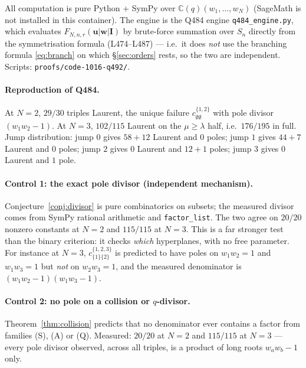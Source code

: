 \documentclass[11pt]{article}
\theoremstyle{plain}
\theoremstyle{definition}
\theoremstyle{remark}
\theoremstyle{plain}
\newcommand{\bI}{\mathbf{I}}
\newcommand{\bu}{\mathbf{u}}
\newcommand{\bw}{\mathbf{w}}
\begin{document}
All computation is pure Python $+$ SymPy over
$\mathbb{C}(q)(w_1,\dots,w_N)$ (SageMath is not installed in this container).
The engine is the Q484 engine \texttt{q484\_engine.py}, which evaluates
$F_{N,n,r}(\bu|\bw|\bI)$ by brute-force summation over $S_n$ directly from the
symmetrisation formula (L474--L487) --- i.e.\ it does \emph{not} use the
branching formula \eqref{eq:branch} on which \S\ref{sec:orders} rests, so the
two are independent.  Scripts: \texttt{proofs/code-1016-q492/}.

\paragraph{Reproduction of Q484.}
At $N=2$, $29/30$ triples Laurent, the unique failure
$c^{\{1,2\}}_{\emptyset\emptyset}$ with pole divisor $(w_1w_2-1)$.  At $N=3$,
$102/115$ Laurent on the $\mu\ge\lambda$ half, i.e.\ $176/195$ in full.  Jump
distribution: jump $0$ gives $58+12$ Laurent and $0$ poles; jump $1$ gives
$44+7$ Laurent and $0$ poles; jump $2$ gives $0$ Laurent and $12+1$ poles; jump
$3$ gives $0$ Laurent and $1$ pole.

\paragraph{Control 1: the exact pole divisor (independent mechanism).}
Conjecture~\ref{conj:divisor} is pure combinatorics on subsets; the measured
divisor comes from SymPy rational arithmetic and \texttt{factor\_list}.  The two
agree on \textbf{$20/20$} nonzero constants at $N=2$ and \textbf{$115/115$} at
$N=3$.  This is a far stronger test than the binary criterion: it checks
\emph{which} hyperplanes, with no free parameter.  For instance at $N=3$,
$c^{\{1,2,3\}}_{\{1\}\{2\}}$ is predicted to have poles on $w_1w_2=1$ and
$w_1w_3=1$ but \emph{not} on $w_2w_3=1$, and the measured denominator is
$(w_1w_2-1)(w_1w_3-1)$.

\paragraph{Control 2: no pole on a collision or $q$-divisor.}
Theorem~\ref{thm:collision} predicts that no denominator ever contains a factor
from families (S), (A) or (Q).  Measured: \textbf{$20/20$} at $N=2$ and
\textbf{$115/115$} at $N=3$ --- every pole divisor observed, across all
triples, is a product of long roots $w_aw_b-1$ only.
\end{document}
